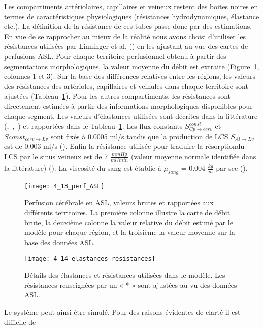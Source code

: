 Les compartiments artériolaires, capillaires et veineux restent des boites noires en termes de
caractéristiques physiologiques (résistances hydrodynamiques, élastance etc.). La définition de la
résistance de ces tubes passe donc par des estimations. En vue de se rapprocher au mieux de la réalité
nous avons choisi d’utiliser les résistances utilisées par Linninger et al. (\cite{Linninger2009}) en les ajustant au vue des cartes
de perfusions ASL. Pour chaque territoire perfusionnel obtenu à partir des segmentations
morphologiques, la valeur moyenne du débit est extraite (Figure~\ref{fig:4_13_perf_ASL}, colonnes 1 et 3). Sur la base des
différences relatives entre les régions, les valeurs des résistances des artérioles, capillaires et veinules
dans chaque territoire sont ajustées (Tableau~\ref{fig:4_13_perf_ASL}). Pour les autres compartiments, les résistances sont
directement estimées à partir des informations morphologiques disponibles pour chaque segment. Les
valeurs d’élastances utilisées sont décrites dans la littérature (\cite{Zagzoule1986},~\cite{Linninger2009},~\cite{Smillie2004}) et rapportées dans le
Tableau~\ref{fig:4_13_perf_ASL}. Les flux constants $S^{const}_{Cp\rightarrow cerv}$ et $S{const}_{cerv\rightarrow Lv}$ sont fixés à 0.0005 ml/s tandis que la
production de LCS $S_{Al\rightarrow Lv}$ est de 0.003 ml/s (\cite{Linninger2009}). Enfin la résistance utilisée pour traduire la résorptiondu LCS par le sinus veineux est de 7 $\frac{mmHg}{ ml/min}$ (valeur moyenne normale identifiée dans la littérature) (\cite{Ekstedt1978}). La viscosité du sang est établie à $\mu_{sang}$ = 0.004 $\frac{kg}{ m}$ par sec (\cite{Pedley1980}).\\
\begin{figure}[!t]
\centering
\texttt{[image: 4\_13\_perf\_ASL]}
\caption{Perfusion cérébrale en ASL, valeurs brutes et rapportées aux différents territoires. La première colonne illustre la
carte de débit brute, la deuxième colonne la valeur relative du débit estimé par le modèle pour chaque région, et la troisième
la valeur moyenne sur la base des données ASL.}
\label{fig:4_13_perf_ASL}	
\end{figure}
\begin{figure}[!t]
\centering
\texttt{[image: 4\_14\_elastances\_resistances]}
\caption{Détails des élastances et résistances utilisées dans le modèle. Les résistances renseignées par un « * » sont
ajustées au vu des données ASL.}
\label{fig:4_14_elastances_resistances}	
\end{figure}
Le système peut ainsi être simulé. Pour des raisons évidentes de clarté il est difficile de
